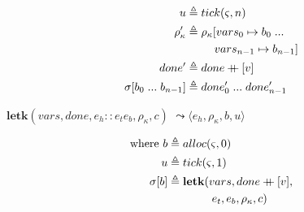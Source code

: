 \documentclass[12pt,draft]{article}
\newcommand\mdoubleplus{\ensuremath{\mathbin{+\mkern-9mu+}}}
\begin{document}
\begin{multicols*}{2}
\begin{align*}
u &\triangleq tick(\varsigma, n) \\
\rho'_{\kappa} &\triangleq \rho_{\kappa}[vars_0 \mapsto b_0\;...\\
&\;\;\;\;\;\;\;\;\;  vars_{n-1} \mapsto b_{n-1}] \\
  done' &\triangleq done \mdoubleplus [v] \\
\sigma[b_0\;...\;b_{n-1}] &\triangleq done'_0\;...\;done'_{n-1}
\end{align*}
\begin{center}
  $\textbf{letk}(vars, done, e_h::e_t e_b , \rho_\kappa, c)$
  $\leadsto \langle e_h , \rho_\kappa , b , u \rangle$
\end{center}
\vspace{-7mm}
\begin{align*}
\text{where } b &\triangleq alloc(\varsigma, 0) \\
u &\triangleq tick(\varsigma, 1) \\
\sigma[b] &\triangleq \textbf{letk}(vars, done \mdoubleplus [v], \\
&\;\;\;\;\;\;\;\;\;\;\;\;\;\; e_t , e_b , \rho_{\kappa} , c)
\end{align*}

\vfill\null
\columnbreak



\end{multicols*}
\end{document}
